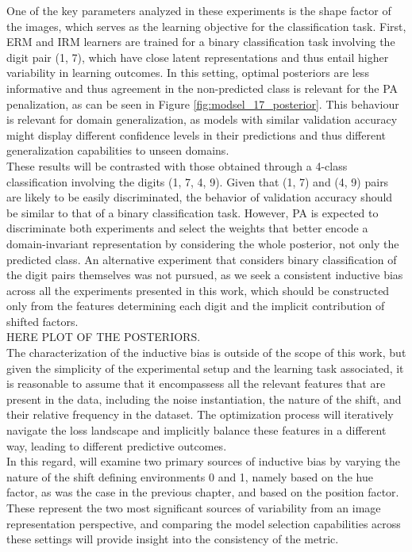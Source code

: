 One of the key parameters analyzed in these experiments is the shape factor of the images, which 
serves as the learning objective for the classification task. First, ERM and IRM learners are 
trained for a binary classification task involving the digit pair (1, 7), which have 
close latent representations and thus entail higher variability in learning outcomes. In this 
setting, optimal posteriors are less informative and thus agreement in the non-predicted
class is relevant for the PA penalization, as can be seen in Figure \ref{fig:modsel_17_posterior}. 
This behaviour is relevant for domain generalization, as models with similar validation accuracy 
might display different confidence levels in their
predictions and thus different generalization capabilities to unseen domains. \\

These results will be contrasted with those obtained through a 4-class classification 
involving the digits (1, 7, 4, 9). Given that (1, 7) and (4, 9) pairs are likely to be easily
discriminated, the behavior of validation accuracy should be similar to that of a binary 
classification task. However, PA is expected to discriminate both experiments and select the 
weights that better encode a domain-invariant representation by considering the whole posterior, 
not only the predicted class. An alternative experiment that considers binary classification of 
the digit pairs themselves was not pursued, as we seek a consistent inductive bias across all
the experiments presented in this work, which should be constructed only from the features 
determining each digit and the implicit contribution of shifted factors. \\

HERE PLOT OF THE POSTERIORS. \\

The characterization of the inductive bias is outside of the scope of this work, but given the
simplicity of the experimental setup and the learning task associated, it is reasonable to assume 
that it encompassess all the relevant features that are present in the data,
including the noise instantiation, the nature of the shift, and their relative frequency in the
dataset. The optimization process will iteratively navigate the loss landscape and implicitly
balance these features in a different way, leading to different predictive outcomes.  \\

In this regard, will examine two primary sources of inductive bias by varying the nature of the
shift defining environments 0 and 1, namely based on the hue factor, as was the case in the
previous chapter, and based on the position factor. These represent the two most significant 
sources of variability from an image representation perspective, and comparing the model selection 
capabilities across these settings will provide insight into the consistency of the metric. \\


